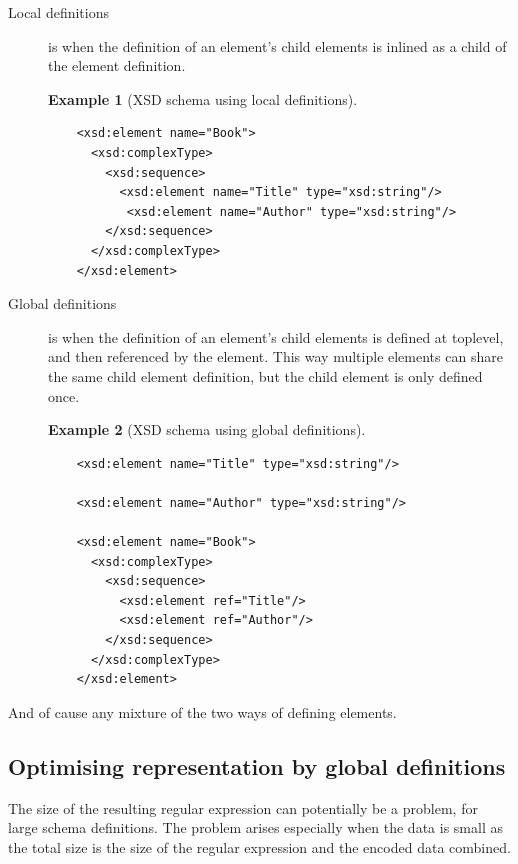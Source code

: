 \documentclass[a4paper, oneside]{memoir}
\theoremstyle{definition}
\newtheorem{example}{Example}
\begin{document}
\begin{description}
\item[Local definitions] is when the definition of an element's child elements is
  inlined as a child of the element definition.

  \begin{example}[XSD schema using local definitions] \ %
\begin{verbatim}
    <xsd:element name="Book">
      <xsd:complexType>
        <xsd:sequence>
          <xsd:element name="Title" type="xsd:string"/>
           <xsd:element name="Author" type="xsd:string"/>
        </xsd:sequence>
      </xsd:complexType>
    </xsd:element>
\end{verbatim}
  \end{example}

\item[Global definitions] is when the definition of an element's child elements
  is defined at toplevel, and then referenced by the element. This way multiple
  elements can share the same child element definition, but the child element is
  only defined once.

  \begin{example}[XSD schema using global definitions] \ %
\begin{verbatim}
    <xsd:element name="Title" type="xsd:string"/>

    <xsd:element name="Author" type="xsd:string"/>

    <xsd:element name="Book">
      <xsd:complexType>
        <xsd:sequence>
          <xsd:element ref="Title"/>
          <xsd:element ref="Author"/>
        </xsd:sequence>
      </xsd:complexType>
    </xsd:element>
\end{verbatim}
  \end{example}

\end{description}

And of cause any mixture of the two ways of defining elements.

\subsection{Optimising representation by global definitions}

The size of the resulting regular expression can potentially be a problem, for
large schema definitions. The problem arises especially when the data is small
as the total size is the size of the regular expression and the encoded data
combined.
\end{document}
